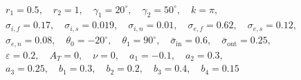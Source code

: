 $$
\begin{gathered}
r_1 = 0.5,\quad r_2 = 1,\quad \gamma_1 = 20^\circ,\quad \gamma_2 = 50^\circ,\quad k = \pi,\\
\sigma_{i,f} = 0.17,\quad \sigma_{i,s} = 0.019,\quad \sigma_{i,n} = 0.01,\quad \sigma_{e,f} = 0.62,\quad \sigma_{e,s} = 0.12,\\
\sigma_{e,n} = 0.08,\quad \theta_0 = -20^\circ,\quad \theta_1 = 90^\circ,\quad \bar\sigma_{\mathrm{in}} = 0.6,\quad \bar\sigma_{\mathrm{out}} = 0.25,\\
\varepsilon = 0.2,\quad A_T = 0,\quad \nu = 0,\quad a_1 = -0.1,\quad a_2 = 0.3,\\
a_3 = 0.25,\quad b_1 = 0.3,\quad b_2 = 0.2,\quad b_3 = 0.4,\quad b_4 = 0.15
\end{gathered}
$$
